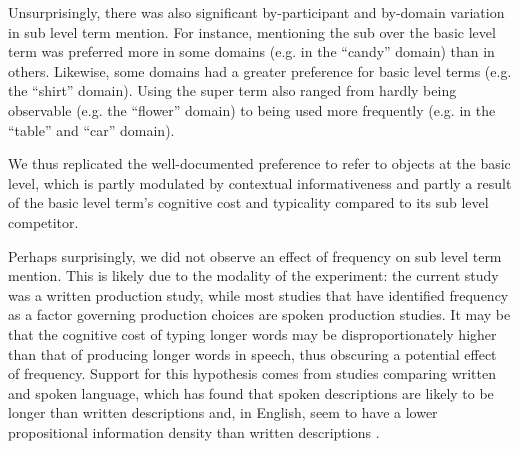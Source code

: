 \documentclass[11pt]{article}
\newcommand{\jd}[1]{\textcolor{Red}{[jd: #1]}}
\newcommand{\figref}[1]{Figure \ref{#1}}
\begin{document}
%


Unsurprisingly, there was also significant by-participant and by-domain variation in sub level term mention. %
For instance, mentioning the sub over the basic level term was preferred more in some domains (e.g. in the ``candy'' domain) than in others. Likewise, some domains had a greater preference for basic level terms (e.g. the ``shirt'' domain). Using the super term also ranged from hardly being observable (e.g. the ``flower'' domain) to being used more frequently (e.g. in the ``table'' and ``car'' domain). 

We thus replicated the well-documented preference to refer to objects at the basic level, which is partly modulated by contextual informativeness and partly a result of the basic level term's cognitive cost and typicality compared to its sub level competitor. 

Perhaps surprisingly, we did not observe an effect of frequency on sub level term mention. This is likely due to the modality of the experiment: the current study was a written production study, while most studies that have identified frequency as a factor governing production choices are spoken production studies. It may be that the cognitive cost of typing longer words may be disproportionately higher than that of producing longer words in speech, thus obscuring a potential effect of frequency. Support for this hypothesis comes from studies comparing written and spoken language, which has found that spoken descriptions are likely to be longer than written descriptions and, in English, seem to have a lower propositional information density than written descriptions \cite{VanMiltenburg2018}.
\end{document}

